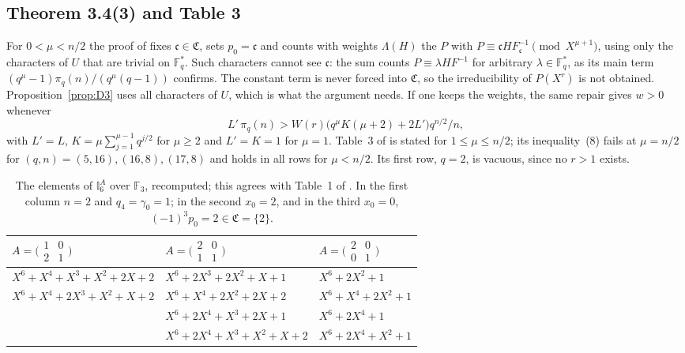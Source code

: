 \documentclass[11pt,a4paper]{amsart}
\theoremstyle{remark}
\newcommand{\F}{\mathbb{F}}
\newcommand{\Fq}{\mathbb{F}_q}
\newcommand{\I}{\mathbb{I}}
\newcommand{\fC}{\mathfrak{C}}
\newcommand{\mat}[4]{\bigl(\begin{smallmatrix}#1&#2\\#3&#4\end{smallmatrix}\bigr)}
\begin{document}
\subsection{Theorem 3.4(3) and Table 3}
For $0<\mu<n/2$ the proof of \cite{K} fixes $\mathfrak{c}\in\fC$, sets $p_0=\mathfrak{c}$ and counts with weights
$\Lambda(H)$ the $P$ with $P\equiv\mathfrak{c}HF_{\mathfrak{c}}^{-1}\pmod{X^{\mu+1}}$, using only the characters
of $U$ that are trivial on $\Fq^*$. Such characters cannot see $\mathfrak{c}$: the sum counts $P\equiv\lambda
HF^{-1}$ for arbitrary $\lambda\in\Fq^*$, as its main term $(q^\mu-1)\pi_q(n)/(q^\mu(q-1))$ confirms. The
constant term is never forced into $\fC$, so the irreducibility of $P(X^r)$ is not obtained. Proposition~\ref{prop:D3}
uses all characters of $U$, which is what the argument needs. If one keeps the weights, the same repair gives
$w>0$ whenever
{\renewcommand{\theHequation}{S3}%
\begin{equation}\label{eq:S3}\tag{S3}
L'\,\pi_q(n)>W(r)\bigl(q^\mu K(\mu+2)+2L'\bigr)q^{n/2}/n,
\end{equation}}%
with $L'=L$, $K=\mu\sum_{j=1}^{\mu-1}q^{j/2}$ for $\mu\ge2$ and $L'=K=1$ for $\mu=1$. Table~3 of \cite{K} is
stated for $1\le\mu\le n/2$; its inequality~(8) fails at $\mu=n/2$ for $(q,n)=(5,16),(16,8),(17,8)$ and holds in
all rows for $\mu<n/2$. Its first row, $q=2$, is vacuous, since no $r>1$ exists.

\begin{table}[t]
\centering\small
\begin{tabular}{lll}
\toprule
$A=\mat1021$ & $A=\mat2011$ & $A=\mat2001$\\
\midrule
$X^6+X^4+X^3+X^2+2X+2$ & $X^6+2X^3+2X^2+X+1$ & $X^6+2X^2+1$\\
$X^6+X^4+2X^3+X^2+X+2$ & $X^6+X^4+2X^2+2X+2$ & $X^6+X^4+2X^2+1$\\
 & $X^6+2X^4+X^3+2X+1$ & $X^6+2X^4+1$\\
 & $X^6+2X^4+X^3+X^2+X+2$ & $X^6+2X^4+X^2+1$\\
\bottomrule
\end{tabular}
\caption{The elements of $\I^A_6$ over $\F_3$, recomputed; this agrees with Table~1 of \cite{K}. In the first
column $n=2$ and $q_4=\gamma_0=1$; in the second $x_0=2$, and in the third $x_0=0$, $(-1)^3p_0=2\in\fC=\{2\}$.}
\label{tab:one}
\end{table}
\end{document}
